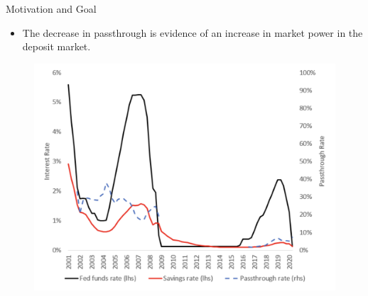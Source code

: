 \documentclass[notes,10.2pt, aspectratio=169]{beamer}
\begin{document}
    
    

\begin{frame}{Motivation and Goal}
    \vspace{0.5cm}
      \begin{itemize}
        \item  The decrease in passthrough is evidence of an increase in market power in the deposit market.

      \end{itemize}

      
                \begin{figure}[t*]
          \centering
          \includegraphics[width=.58\textwidth]{./imgs/figure1}
        \end{figure}


      \end{frame}
    
\end{document}
